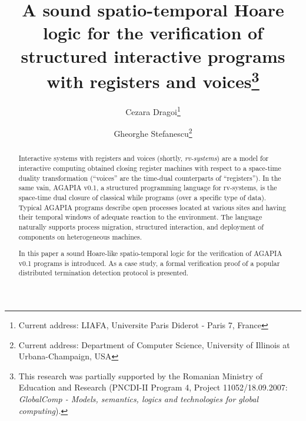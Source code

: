 \documentclass[runningheads]{llncs}
\newcommand{\out}[1]{}
\newcommand{\1}{\u{a}}
\newcommand{\2}{\c{s}}
\newcommand{\5}{\c{t}}
\newcommand{\8}{\^{\i}}
\newcommand{\9}{\^{a}}
\newcommand{\svsp}{\vspace{1ex}}
\begin{document}
\pagestyle{headings}\setcounter{page}{1}

\mainmatter

\title{A sound spatio-temporal Hoare logic for the verification of structured interactive programs with
  registers and voices\vspace{-.3cm}\thanks{
This research was partially supported by the Romanian Ministry of Education and Research (PNCDI-II Program 4,
Project 11052/18.09.2007: {\em GlobalComp - Models, semantics, logics and technologies for global
  computing}).}}
\author{Cezara Dragoi\thanks{
Current address: LIAFA, Universite Paris Diderot - Paris 7, France} \and 
Gheorghe Stefanescu\thanks{Current address: Department of Computer Science, 
  University of Illinois at Urbana-Champaign, USA}}
\maketitle\thispagestyle{empty}



\begin{abstract}

Interactive systems with registers and voices (shortly, {\em rv-systems}) are a model for interactive
computing obtained closing register machines with respect to a space-time duality transformation (``voices''
are the time-dual counterparts of ``registers''). In the same vain, AGAPIA v0.1, a structured programming
language for rv-systems, is the space-time dual closure of classical while programs (over a specific type of
data). Typical AGAPIA programs describe open processes located at various sites and having their temporal
windows of adequate reaction to the environment. The language naturally supports process migration, structured
interaction, and deployment of components on heterogeneous machines.\svsp

In this paper a sound Hoare-like spatio-temporal logic for the verification of AGAPIA v0.1 programs is
introduced. As a case study, a formal verification proof of a popular distributed termination detection
protocol is presented.\svsp
\out{
{\it Keywords:} interactive systems, structured rv-systems, registers and voices, spatio-temporal logics,
formal verification, Hoare logic, mobile systems, distributed protocols, ring termination detection
}
\end{abstract}
\end{document}
